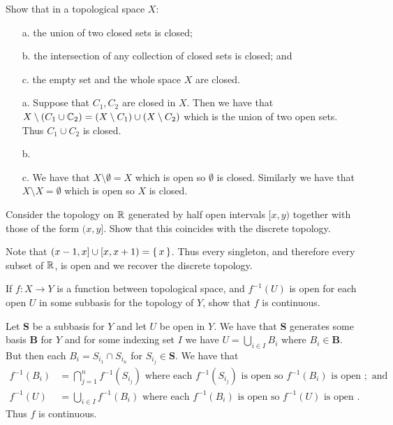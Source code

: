 \documentclass[letterpaper, 11pt, oneside]{book}
\begin{document}
\begin{exercise}
  Show that in a topological space $X$:
  \begin{enumerate}
  \item[a.] the union of two closed sets is closed;
  \item[b.] the intersection of any collection of closed sets is closed; and
  \item[c.] the empty set and the whole space $X$ are closed.
  \end{enumerate}
\end{exercise}
\begin{pf}
  \begin{enumerate}
  \item[a.] Suppose that $C_{1}, C_{2}$ are closed in $X$.
        Then we have that $X \setminus (C_{1} \cup \mathbb{C}_{2}) = (X \setminus C_{1}) \cup (X \setminus C_{2})$ which is the union of two open sets.
        Thus $C_{1} \cup C_{2}$ is closed.
  \item[b.] 
  \item[c.] We have that $X \setminus \emptyset = X$ which is open so $\emptyset$ is closed.
        Similarly we have that $X \setminus X = \emptyset$ which is open so $X$ is closed.
  \end{enumerate}
\end{pf}

\begin{exercise}
  Consider the topology on $\mathbb{R}$ generated by half open intervals $[x, y)$ together with those of the form $(x, y]$.
  Show that this coincides with the discrete topology.
\end{exercise}
\begin{pf}
  Note that $(x - 1, x] \cup [x, x + 1) = \set{x}$.
  Thus every singleton, and therefore every subset of $\mathbb{R}$, is open and we recover the discrete topology.
\end{pf}

\begin{exercise}
  If $f\colon X \to Y$ is a function between topological space, and $f^{-1}(U)$ is open for each open $U$ in some subbasis for the topology of $Y$, show that $f$ is continuous.
\end{exercise}
\begin{pf}
  Let \textbf{S} be a subbasis for $Y$ and let $U$ be open in $Y$.
  We have that \textbf{S} generates some basis \textbf{B} for $Y$ and for some indexing set $I$ we have $U = \bigcup_{i \in I} B_{i}$ where $B_{i} \in \textbf{B}$.
  But then each $B_{i} = S_{i_{1}} \cap S_{i_{n}}$ for $S_{i_{j}} \in \textbf{S}$.
  We have that
  \begin{align*}
    f^{-1}(B_{i}) &= \bigcap_{j = 1}^{n} f^{-1}(S_{i_{j}}) \text{ where each } f^{-1}(S_{i_{j}}) \text{ is open so } f^{-1}(B_{i}) \text{ is open }; \text{ and} \\
    f^{-1}(U) &= \bigcup_{i \in I} f^{-1}(B_{i}) \text{ where each } f^{-1}(B_{i}) \text{ is open so } f^{-1}(U) \text{ is open }.
  \end{align*}
  Thus $f$ is continuous.
\end{pf}
\end{document}
